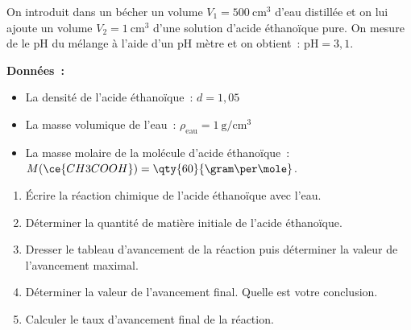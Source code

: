 On introduit dans un bécher un volume $V_{1}=\qty{500}{\cubic\cm}$ d'eau
distillée et on lui ajoute un volume $V_{2}=\qty{1}{\cubic\cm}$ d'une solution
d'acide éthanoïque pure.
On mesure de le pH du mélange à l'aide d'un pH mètre et on obtient~:
$\mathrm{pH}=3,1$.

\textbf{Données~:}
\begin{itemize}
    \item La densité de l'acide éthanoïque~: $d=1,05$
    \item La masse volumique de l'eau~:
          $\rho_{\text{eau}}=\qty{1}{\gram\per\cubic\cm}$
    \item La masse molaire de la molécule d'acide éthanoïque~:
          $M(\ce{CH3COOH})=\qty{60}{\gram\per\mole}$.
\end{itemize}

\begin{enumerate}
    \item Écrire la réaction chimique de l'acide éthanoïque avec l'eau.
    \item Déterminer la quantité de matière initiale de l'acide éthanoïque.
    \item Dresser le tableau d'avancement de la réaction puis déterminer la
          valeur de l'avancement maximal.
    \item Déterminer la valeur de l'avancement final. Quelle est votre
          conclusion.
    \item Calculer le taux d'avancement final de la réaction.
\end{enumerate}

